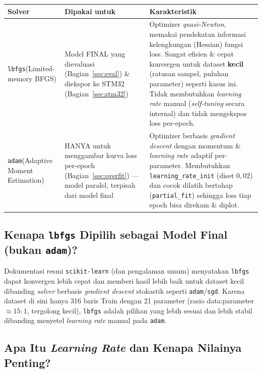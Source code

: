 \documentclass[11pt,a4paper]{article}
\begin{document}
\begin{center}
\begin{tabular}{@{}p{2.6cm} p{3.6cm} p{7.9cm}@{}}
\toprule
\textbf{Solver} & \textbf{Dipakai untuk} & \textbf{Karakteristik} \\
\midrule
\texttt{lbfgs}\newline (Limited-memory BFGS) & Model FINAL yang dievaluasi (Bagian~\ref{sec:eval}) \& diekspor ke STM32 (Bagian~\ref{sec:stm32}) &
Optimizer \emph{quasi-Newton}, memakai pendekatan informasi kelengkungan (Hessian) fungsi
loss. Sangat efisien \& cepat konvergen untuk dataset \textbf{kecil} (ratusan sampel,
puluhan parameter) seperti kasus ini. Tidak membutuhkan \emph{learning rate} manual
(\emph{self-tuning} secara internal) dan tidak mengekspos loss per-epoch. \\
\addlinespace
\texttt{adam}\newline (Adaptive Moment Estimation) & HANYA untuk menggambar kurva loss per-epoch (Bagian~\ref{sec:overfit}) --- model paralel, terpisah dari model final &
Optimizer berbasis \emph{gradient descent} dengan momentum \& \emph{learning rate}
adaptif per-parameter. Membutuhkan \texttt{learning\_rate\_init} (diset $0{,}02$) dan
cocok dilatih bertahap (\texttt{partial\_fit}) sehingga loss tiap epoch bisa direkam \&
diplot. \\
\bottomrule
\end{tabular}
\end{center}

\subsection{Kenapa \texttt{lbfgs} Dipilih sebagai Model Final (bukan \texttt{adam})?}

Dokumentasi resmi \texttt{scikit-learn} (dan pengalaman umum) menyatakan \texttt{lbfgs}
dapat konvergen lebih cepat dan memberi hasil lebih baik untuk dataset kecil dibanding
\emph{solver} berbasis \emph{gradient descent} stokastik seperti \texttt{adam}/\texttt{sgd}.
Karena dataset di sini hanya 316 baris Train dengan 21 parameter (rasio data:parameter
$\approx 15{:}1$, tergolong kecil), \texttt{lbfgs} adalah pilihan yang lebih sesuai dan
lebih stabil dibanding menyetel \emph{learning rate} manual pada \texttt{adam}.

\subsection{Apa Itu \emph{Learning Rate} dan Kenapa Nilainya Penting?}
\end{document}
